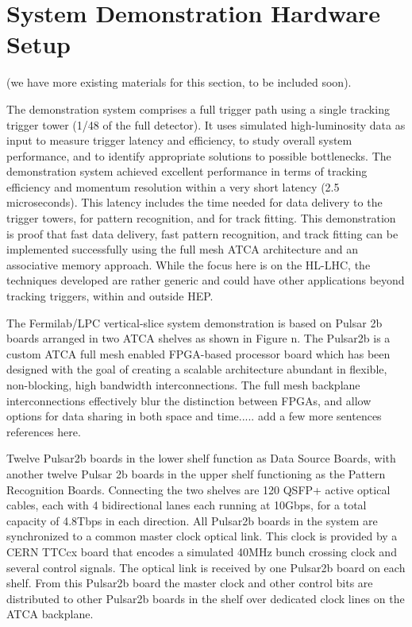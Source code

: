 \section{System Demonstration Hardware Setup \label{sec:hardwaresetup}}


(we have more existing materials for this section, to be included soon).

The demonstration system comprises a full trigger path using a single tracking trigger tower (1/48 of the full detector). It uses simulated high-luminosity data as input to measure trigger latency and efficiency, to study overall system performance, and to identify appropriate solutions to possible bottlenecks. 
The demonstration system achieved excellent performance in terms of tracking efficiency and momentum resolution within a very short latency (2.5 microseconds). This latency includes the time needed for data delivery to the trigger towers, for pattern recognition, and for track fitting. This demonstration is proof that fast data delivery, fast pattern recognition, and track fitting can be implemented successfully using the full mesh ATCA architecture and an associative memory approach. While the focus here is on the HL-LHC, the techniques developed are rather generic and could have other applications beyond tracking triggers, within and outside HEP.

The Fermilab/LPC vertical-slice system demonstration is based on Pulsar 2b boards arranged in two ATCA shelves as shown in Figure n. The Pulsar2b is a custom ATCA full mesh enabled FPGA-based processor board which has been designed with the goal of creating a scalable architecture abundant in flexible, non-blocking, high bandwidth interconnections. The full mesh backplane interconnections effectively blur the distinction between FPGAs, and allow options for data sharing in both space and time..... add a few more sentences references here. 

Twelve Pulsar2b boards in the lower shelf function as Data Source Boards, with another twelve Pulsar 2b boards in the upper shelf functioning as the Pattern Recognition Boards.  Connecting the two shelves are 120 QSFP+ active optical cables, each with 4 bidirectional lanes each running at 10Gbps, for a total capacity of 4.8Tbps in each direction. All Pulsar2b boards in the system are synchronized to a common master clock optical link. This clock is provided by a CERN TTCcx board that encodes a simulated 40MHz bunch crossing clock and several control signals. The optical link is received by one Pulsar2b board on each shelf.  From this Pulsar2b board the master clock and other control bits are distributed to other Pulsar2b boards in the shelf over dedicated clock lines  on the ATCA backplane. 

